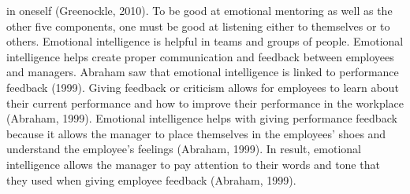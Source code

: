 \documentclass[
  12pt,
]{article}
\begin{document}
in oneself (Greenockle, 2010). To be good at emotional mentoring as well as the other five components, one must be good at listening either to themselves or to others. Emotional intelligence is helpful in teams and groups of people. Emotional intelligence helps create proper communication and feedback between employees and managers. Abraham saw that emotional intelligence is linked to performance feedback (1999). Giving feedback or criticism allows for employees to learn about their current performance and how to improve their performance in the workplace (Abraham, 1999). Emotional intelligence helps with giving performance feedback because it allows the manager to place themselves in the employees' shoes and understand the employee's feelings (Abraham, 1999). In result, emotional intelligence allows the manager to pay attention to their words and tone that they used when giving employee feedback (Abraham, 1999).
\end{document}
